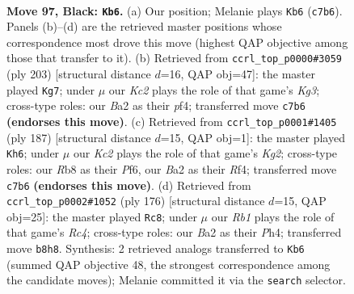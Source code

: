 \documentclass[11pt]{article}
\begin{document}
\clearpage

\begin{figure}[p]\centering
\begin{subfigure}{0.46\textwidth}\centering
\resizebox{\linewidth}{!}{%
\newchessgame
\chessboard[
  setfen={1r6/1Pk5/8/6R1/4K3/8/b7/5R2 b - - 2 97},
  showmover=false,
  pgfstyle=straightmove, color=movearrow, markmove={c7-b6}
]}
\caption{}
\end{subfigure}\hfill
\begin{subfigure}{0.46\textwidth}\centering
\resizebox{\linewidth}{!}{%
\newchessgame
\chessboard[
  setfen={8/7P/6kr/R7/5PK1/8/8/8 b - - 8 102},
  showmover=false,
  pgfstyle=straightmove, color=movearrow, markmove={g6-g7}
]}
\caption{}
\end{subfigure}
\\[4pt]
\begin{subfigure}{0.46\textwidth}\centering
\resizebox{\linewidth}{!}{%
\newchessgame
\chessboard[
  setfen={8/R5k1/5p2/5P2/5r2/8/6K1/8 b - - 1 94},
  showmover=false,
  pgfstyle=straightmove, color=movearrow, markmove={g7-h6}
]}
\caption{}
\end{subfigure}\hfill
\begin{subfigure}{0.46\textwidth}\centering
\resizebox{\linewidth}{!}{%
\newchessgame
\chessboard[
  setfen={8/8/8/5k2/2R3pP/6K1/r7/8 w - - 9 89},
  showmover=false,
  pgfstyle=straightmove, color=movearrow, markmove={c4-c8}
]}
\caption{}
\end{subfigure}
\caption{\textbf{Move 97, Black: \texttt{Kb6}.} (a) Our position; Melanie plays \texttt{Kb6} (\texttt{c7b6}). Panels (b)--(d) are the retrieved master positions whose correspondence most drove this move (highest QAP objective among those that transfer to it). (b) Retrieved from \texttt{ccrl\_top\_p0000\#3059} (ply 203) [structural distance $d$=16, QAP obj=47]: the master played \texttt{Kg7}; under $\mu$ our \emph{Kc2} plays the role of that game's \emph{Kg3}; cross-type roles: our \emph{B}a2 as their \emph{p}f4; transferred move \texttt{c7b6} \textbf{(endorses this move)}. (c) Retrieved from \texttt{ccrl\_top\_p0001\#1405} (ply 187) [structural distance $d$=15, QAP obj=1]: the master played \texttt{Kh6}; under $\mu$ our \emph{Kc2} plays the role of that game's \emph{Kg2}; cross-type roles: our \emph{R}b8 as their \emph{P}f6, our \emph{B}a2 as their \emph{R}f4; transferred move \texttt{c7b6} \textbf{(endorses this move)}. (d) Retrieved from \texttt{ccrl\_top\_p0002\#1052} (ply 176) [structural distance $d$=15, QAP obj=25]: the master played \texttt{Rc8}; under $\mu$ our \emph{Rb1} plays the role of that game's \emph{Rc4}; cross-type roles: our \emph{B}a2 as their \emph{P}h4; transferred move \texttt{b8h8}. Synthesis: 2 retrieved analogs transferred to \texttt{Kb6} (summed QAP objective 48, the strongest correspondence among the candidate moves); Melanie committed it via the \texttt{search} selector.}
\label{fig:thought-m193}
\end{figure}
\end{document}
